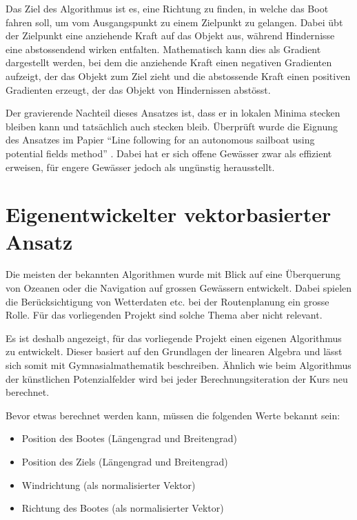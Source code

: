 Das Ziel des Algorithmus ist es, eine Richtung zu finden, in welche das Boot fahren soll, um vom Ausgangspunkt zu einem Zielpunkt zu gelangen. Dabei übt der Zielpunkt eine anziehende Kraft auf das Objekt aus, während Hindernisse eine abstossendend wirken entfalten. Mathematisch kann dies als Gradient dargestellt werden, bei dem die anziehende Kraft einen negativen Gradienten aufzeigt, der das Objekt zum Ziel zieht und die abstossende Kraft einen positiven Gradienten erzeugt, der das Objekt von Hindernissen abstösst.

Der gravierende Nachteil dieses Ansatzes ist, dass er in lokalen Minima stecken bleiben kann und tatsächlich auch stecken bleib. Überprüft wurde die Eignung des Ansatzes im Papier \enquote{Line following for an autonomous sailboat using potential ﬁelds method} \cite{inproceedings} . Dabei hat er sich offene Gewässer zwar als effizient erweisen, für engere Gewässer jedoch als ungünstig herausstellt.

\section{Eigenentwickelter vektorbasierter Ansatz}
Die meisten der bekannten Algorithmen wurde mit Blick auf eine Überquerung von Ozeanen oder die Navigation auf grossen Gewässern entwickelt. Dabei spielen die Berücksichtigung von Wetterdaten etc. bei der Routenplanung ein grosse Rolle. Für das vorliegenden Projekt sind solche Thema aber nicht relevant.

Es ist deshalb angezeigt, für das vorliegende Projekt einen eigenen Algorithmus zu entwickelt. Dieser basiert auf den Grundlagen der linearen Algebra und lässt sich somit mit Gymnasialmathematik beschreiben. Ähnlich wie beim Algorithmus der künstlichen Potenzialfelder wird bei jeder Berechnungsiteration der Kurs neu berechnet.

Bevor etwas berechnet werden kann, müssen die folgenden Werte bekannt sein:
\begin{itemize}
    \item Position des Bootes (Längengrad und Breitengrad)
    \item Position des Ziels (Längengrad und Breitengrad)
    \item Windrichtung (als normalisierter Vektor)
    \item Richtung des Bootes (als normalisierter Vektor)
    
\end{itemize}


